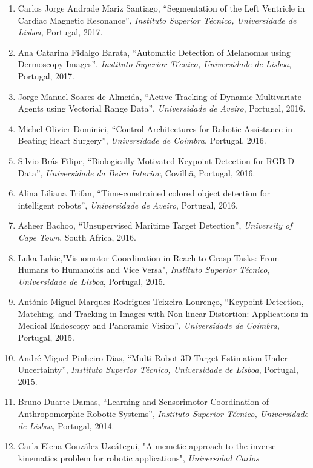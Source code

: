 \documentclass[
]{article}
\begin{document}
\begin{enumerate}
  using neural networks'', \emph{Universidade do Algarve}, Faro,
  Portugal, 2017.
\item
  Carlos Jorge Andrade Mariz Santiago, ``Segmentation of the Left
  Ventricle in Cardiac Magnetic Resonance'', \emph{Instituto Superior
  Técnico, Universidade de Lisboa}, Portugal, 2017.
\item
  Ana Catarina Fidalgo Barata, ``Automatic Detection of Melanomas using
  Dermoscopy Images'', \emph{Instituto Superior Técnico, Universidade de
  Lisboa}, Portugal, 2017.
\item
  Jorge Manuel Soares de Almeida, ``Active Tracking of Dynamic
  Multivariate Agents using Vectorial Range Data'', \emph{Universidade
  de Aveiro}, Portugal, 2016.
\item
  Michel Olivier Dominici, ``Control Architectures for Robotic
  Assistance in Beating Heart Surgery'', \emph{Universidade de Coimbra},
  Portugal, 2016.
\item
  Silvio Brás Filipe, ``Biologically Motivated Keypoint Detection for
  RGB-D Data'', \emph{Universidade da Beira Interior}, Covilhã,
  Portugal, 2016.
\item
  Alina Liliana Trifan, ``Time-constrained colored object detection for
  intelligent robots'', \emph{Universidade de Aveiro}, Portugal, 2016.
\item
  Asheer Bachoo, ``Unsupervised Maritime Target Detection'',
  \emph{University of Cape Town}, South Africa, 2016.
\item
  Luka Lukic,"Visuomotor Coordination in Reach-to-Grasp Tasks: From
  Humans to Humanoids and Vice Versa", \emph{Instituto Superior Técnico,
  Universidade de Lisboa}, Portugal, 2015.
\item
  António Miguel Marques Rodrigues Teixeira Lourenço, ``Keypoint
  Detection, Matching, and Tracking in Images with Non-linear
  Distortion: Applications in Medical Endoscopy and Panoramic Vision'',
  \emph{Universidade de Coimbra}, Portugal, 2015.
\item
  André Miguel Pinheiro Dias, ``Multi-Robot 3D Target Estimation Under
  Uncertainty'', \emph{Instituto Superior Técnico, Universidade de
  Lisboa}, Portugal, 2015.
\item
  Bruno Duarte Damas, ``Learning and Sensorimotor Coordination of
  Anthropomorphic Robotic Systems'', \emph{Instituto Superior Técnico,
  Universidade de Lisboa}, Portugal, 2014.
\item
  Carla Elena González Uzcátegui, "A memetic approach to the inverse
  kinematics problem for robotic applications", \emph{Universidad Carlos
}
\end{enumerate}
\end{document}
